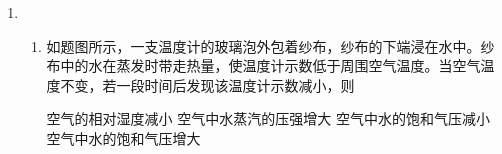 \begin{enumerate}[leftmargin=0em]
\begin{enumerate}
\begin{enumerate}
\end{enumerate}
\begin{figure}[h!]
\flushright

\end{figure}





\end{enumerate}



\item 
{}
\begin{enumerate}
\renewcommand{\labelenumi}{\arabic{enumi}.}
\item
如题图所示，一支温度计的玻璃泡外包着纱布，纱布的下端浸在水中。纱布中的水在蒸发时带走热量，使温度计示数低于周围空气温度。当空气温度不变，若一段时间后发现该温度计示数减小，则  
\begin{figure}[h!]
\centering

\end{figure}

\fourchoices
{空气的相对湿度减小}
{空气中水蒸汽的压强增大}
{空气中水的饱和气压减小}
{空气中水的饱和气压增大}




\end{enumerate}
\end{enumerate}
